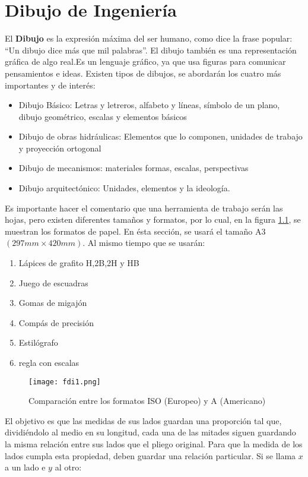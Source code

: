 \chapter{Dibujo de Ingeniería}
El \textbf{Dibujo} es la expresión máxima del ser humano, como dice la frase popular: ``Un dibujo dice más que mil palabras''.
El dibujo también es una representación gráfica de algo real.Es un lenguaje gráfico, ya que usa figuras para comunicar pensamientos e ideas.
Existen tipos de dibujos, se abordarán los cuatro más importantes y de interés:
\begin{itemize}
	\item Dibujo Básico: Letras y letreros, alfabeto y líneas, símbolo de un plano, dibujo geométrico, escalas y elementos básicos
	\item Dibujo de obras hidráulicas: Elementos que lo componen, unidades de trabajo y proyección ortogonal
	\item Dibujo de mecanismos: materiales formas, escalas, perspectivas
	\item Dibujo arquitectónico: Unidades, elementos y la ideología.
\end{itemize}

Es importante hacer el comentario que una herramienta de trabajo serán las hojas, pero existen diferentes tamaños
y formatos, por lo cual, en la figura \ref{fdi1}, se muestran los formatos de papel. En ésta sección,
se usará el tamaño A3 $(297mm \times  420mm)$. Al mismo tiempo que se usarán:

\begin{enumerate}
	\item Lápices de grafito H,2B,2H y HB
	\item Juego de escuadras
	\item Gomas de migajón
	\item Compás de precisión
	\item Estilógrafo
	\item regla con escalas
\end{enumerate}

\begin{figure}

	\centerline{\texttt{[image: fdi1.png]}}
	\caption{Comparación entre los formatos ISO (Europeo) y A (Americano)}
	\label{fdi1}
\end{figure}




El objetivo es que las medidas de sus lados guardan una proporción tal que, dividiéndolo al medio en su longitud, cada una de las mitades
siguen guardando la misma relación entre sus lados que el pliego original.
Para que la medida de los lados cumpla esta propiedad, deben guardar una relación particular. Si se llama $x$ a un lado e $y$ al otro:


